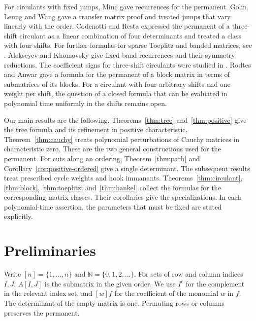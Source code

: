 \documentclass[11pt,reqno]{amsart}
\theoremstyle{remark}
\numberwithin{equation}{section}
\newcommand{\N}{\mathbb N}
\begin{document}
For circulants with fixed jumps, Minc \cite{Minc1985,Minc1987}
gave recurrences for the permanent. Golin, Leung and Wang
\cite{GolinLeungWang} gave a transfer matrix proof and treated
jumps that vary linearly with the order. Codenotti and Resta
\cite{CodenottiRestaSparse} expressed the permanent of a
three-shift circulant as a linear combination of four
determinants and treated a class with four shifts. For further
formulas for sparse Toeplitz and banded matrices, see
\cite{CodenottiToeplitz,RestaSburlati,Schwartz}. Alekseyev and
Khomovsky \cite{AK1,AK2} give fixed-band recurrences and their
symmetry reductions. The coefficient
signs for three-shift circulants were studied in
\cite{LWW,DePoiSparse}. Rodtes and Anwar \cite{RodtesAnwar} gave
a formula for the permanent of a block matrix in terms of
submatrices of its blocks. For a circulant with four arbitrary
shifts and one weight per shift, the question of a closed formula
that can be evaluated in polynomial time uniformly in the shifts
remains open.

Our main results are the following. Theorems~\ref{thm:tree}
and~\ref{thm:positive} give the tree formula and its refinement in
positive characteristic. Theorem~\ref{thm:cauchy} treats polynomial
perturbations of Cauchy matrices in characteristic zero. These are
the two general constructions used for the permanent. For cuts
along an ordering, Theorem~\ref{thm:path} and
Corollary~\ref{cor:positive-ordered} give a single determinant.
The subsequent results treat prescribed cycle weights and hook
immanants. Theorems~\ref{thm:circulant}, \ref{thm:block},
\ref{thm:toeplitz} and~\ref{thm:hankel} collect the formulas for
the corresponding matrix classes. Their corollaries give the
specializations. In each polynomial-time assertion, the parameters
that must be fixed are stated explicitly.

\section{Preliminaries}\label{sec:preliminaries}

Write \([n]=\{1,\ldots,n\}\) and \(\N=\{0,1,2,\ldots\}\).
For sets of row and column indices \(I,J\), \(A[I,J]\) is the
submatrix in the given order. We use \(I^c\) for the complement
in the relevant index set, and \([w]f\) for the coefficient
of the monomial \(w\) in \(f\). The determinant of the empty
matrix is one. Permuting rows or columns preserves the permanent.
\end{document}
